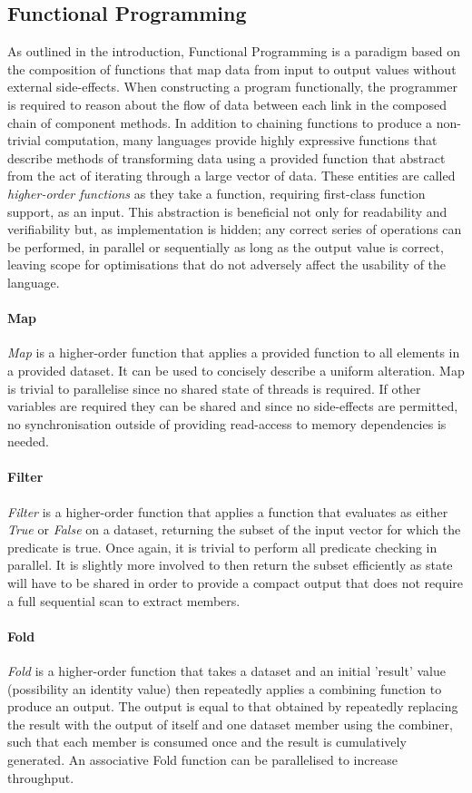 \subsection{Functional Programming}
As outlined in the introduction, Functional Programming is a paradigm based on the composition of functions that map data from input to output values without external side-effects. When constructing a program functionally, the programmer is required to reason about the flow of data between each link in the composed chain of component methods.
In addition to chaining functions to produce a non-trivial computation, many languages provide highly expressive functions \cite{ghc} that describe methods of transforming data using a provided function that abstract from the act of iterating through a large vector of data.
These entities are called \emph{higher-order functions} as they take a function, requiring first-class function support, as an input.
This abstraction is beneficial not only for readability and verifiability but, as implementation is hidden; any correct series of operations can be performed, in parallel or sequentially as long as the output value is correct, leaving scope for optimisations that do not adversely affect the usability of the language.
\paragraph{Map}
\emph{Map} is a higher-order function that applies a provided function to all elements in a provided dataset. It can be used to concisely describe a uniform alteration.
Map is trivial to parallelise since no shared state of threads is required.
If other variables are required they can be shared and since no side-effects are permitted, no synchronisation outside of providing read-access to memory dependencies is needed.
\paragraph{Filter}
\emph{Filter} is a higher-order function that applies a function that evaluates as either \emph{True} or \emph{False} on a dataset, returning the subset of the input vector for which the predicate is true. Once again, it is trivial to perform all predicate checking in parallel. It is slightly more involved to then return the subset efficiently as state will have to be shared in order to provide a compact output that does not require a full sequential scan to extract members.
\paragraph{Fold}
\emph{Fold} is a higher-order function that takes a dataset and an initial 'result' value (possibility an identity value) then repeatedly applies a combining function to produce an output. The output is equal to that obtained by repeatedly replacing the result with the output of itself and one dataset member using the combiner, such that each member is consumed once and the result is cumulatively generated. An associative Fold function can be parallelised to increase throughput.
